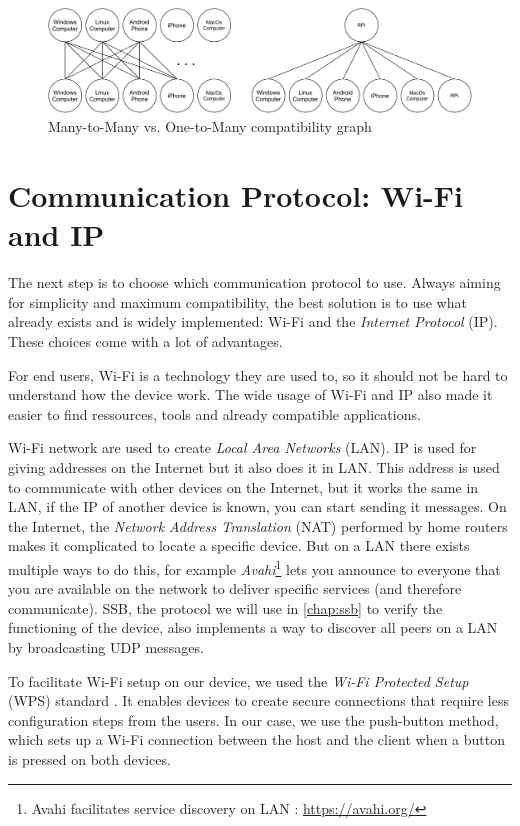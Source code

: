 \documentclass[a4paper,11pt,oneside]{report}
\begin{document}
\begin{figure}
  \includegraphics[width=\linewidth]{figures/compatibilityGraph.pdf}
  \caption{Many-to-Many vs. One-to-Many compatibility graph}
  \label{fig:compatGraph}
\end{figure}

\section{Communication Protocol: Wi-Fi and IP}

The next step is to choose which communication protocol to use. Always aiming for simplicity and maximum compatibility, the best solution is to use what already exists and is widely implemented: Wi-Fi and the \emph{Internet Protocol} (IP). These choices come with a lot of advantages.

For end users, Wi-Fi is a technology they are used to, so it should not be hard to understand how the device work. The wide usage of Wi-Fi and IP also made it easier to find ressources, tools and already compatible applications.

Wi-Fi network are used to create \emph{Local Area Networks} (LAN). IP is used for giving addresses on the Internet but it also does it in LAN. This address is used to communicate with other devices on the Internet, but it works the same in LAN, if the IP of another device is known, you can start sending it messages. On the Internet, the \emph{Network Address Translation} (NAT) performed by home
routers makes it complicated to locate a specific device. But on a LAN there exists multiple ways to do this, for example \emph{Avahi}\footnote{Avahi facilitates service discovery on LAN : \url{https://avahi.org/}} lets you announce to everyone that you are available on the network to deliver specific services (and therefore communicate). SSB, the protocol we will use in \autoref{chap:ssb} to verify the functioning of the device, also implements a way to discover all peers on a LAN by broadcasting UDP messages.

To facilitate Wi-Fi setup on our device, we used the \emph{Wi-Fi Protected Setup} (WPS) standard \cite{wifi2016}. It enables devices to create secure connections that require less configuration steps from the users. In our case, we use the push-button method, which sets up a Wi-Fi connection between the host and the client when a button is pressed on both devices.
\end{document}
